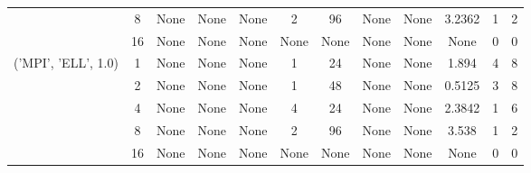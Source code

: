 \begin{tabular}{cccccccccccc}
& 8& None& None& None& 2& 96& None& None& 3.2362& 1& 2\\
& 16& None& None& None& None& None& None& None& None& 0& 0\\
\hline
\multirow{5}{*}{('MPI', 'ELL', 1.0)}& 1& None& None& None& 1& 24& None& None& 1.894& 4& 8\\
& 2& None& None& None& 1& 48& None& None& 0.5125& 3& 8\\
& 4& None& None& None& 4& 24& None& None& 2.3842& 1& 6\\
& 8& None& None& None& 2& 96& None& None& 3.538& 1& 2\\
& 16& None& None& None& None& None& None& None& None& 0& 0\\
\hline
\end{tabular}



